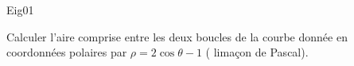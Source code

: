 \begin{tiny}Eig01\end{tiny}
Calculer l'aire comprise entre les deux boucles de la courbe donnée en coordonn{\'e}es polaires par $\rho=2\cos \theta -1$ ( lima\c{c}on de Pascal).
